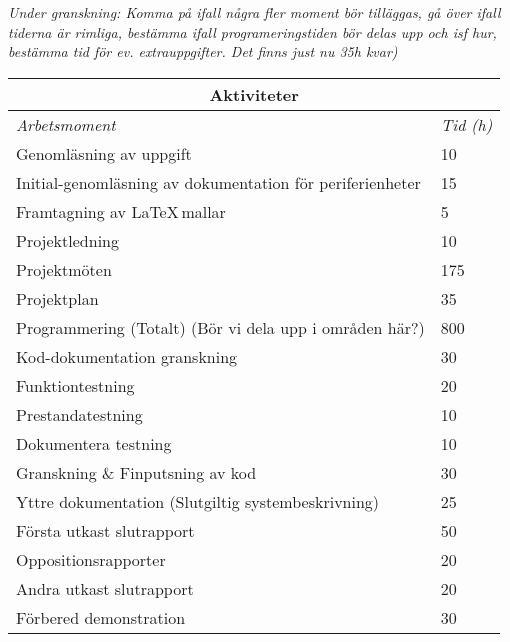 \documentclass[a4paper]{article}
\begin{document}
\textit{Under granskning: Komma på ifall några fler moment bör tilläggas, gå över ifall tiderna är rimliga, bestämma ifall programeringstiden bör delas upp och isf hur, bestämma tid för ev. extrauppgifter. Det finns just nu 35h kvar)}
\begin{table}[htb]
\begin{tabular}{|l|l|}
\hline
\multicolumn{2}{|c|}{\textbf{Aktiviteter}}                                   \\ \hline
\textit{Arbetsmoment}                                     & \textit{Tid (h)} \\ \hline
Genomläsning av uppgift                                   & 10               \\
Initial-genomläsning av dokumentation för periferienheter & 15               \\
Framtagning av \LaTeX \,mallar                     & 5                \\
Projektledning                                            & 10               \\
Projektmöten                                              & 175              \\
Projektplan                                               & 35               \\
Programmering (Totalt) (Bör vi dela upp i områden här?)   & 800              \\
Kod-dokumentation granskning                              & 30               \\
Funktiontestning                                          & 20               \\
Prestandatestning                                         & 10               \\
Dokumentera testning                                      & 10               \\
Granskning \& Finputsning av kod                          & 30               \\
Yttre dokumentation (Slutgiltig systembeskrivning)        & 25               \\
Första utkast slutrapport                                 & 50               \\
Oppositionsrapporter                                      & 20               \\
Andra utkast slutrapport                                  & 20               \\
Förbered demonstration                                    & 30               \\

\end{tabular}
\end{table}
\end{document}
